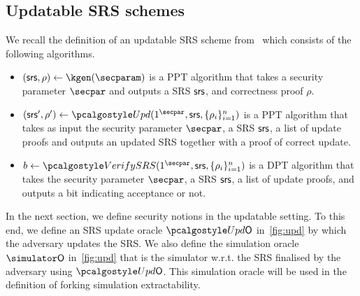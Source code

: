 

\subsection{Updatable SRS schemes}
We recall the definition of an updatable SRS scheme from~\cite{C:GKMMM18} which consists of the following algorithms.

\begin{itemize}
	\item
	$(\srs,\rho) \leftarrow \kgen(\secparam)$ is a PPT algorithm that takes a security parameter $\secpar$ and outputs a SRS $\mathsf{srs}$, and correctness proof $\rho$.
	\item
	$ (\srs',\rho') \leftarrow \upd(1^\secpar,\srs,\{\rho_i \}_{i=1}^n)$ is a PPT algorithm that takes as input the security parameter $\secpar$, a SRS $\mathsf{srs}$, a list of update proofs and outputs an updated SRS together with a proof of correct update. 
	\item
	$b \leftarrow \verifyCRS(1^\secpar,\srs,\{\rho_i \}_{i=1}^n)$ is a DPT algorithm that takes the security parameter $\secpar$, a SRS $\mathsf{srs}$, a list of update proofs, and outputs a bit indicating acceptance or not.
\end{itemize}

In the next section, we define security notions in the updatable setting. To this end, we define an SRS update oracle $\initU$ in~\cref{fig:upd} by which the adversary updates the SRS. We also define the simulation oracle $\simO$ in~\cref{fig:upd} that is the simulator w.r.t. the SRS finalised by the adversary using $\initU$. This simulation oracle will be used in the definition of forking simulation extractability.

